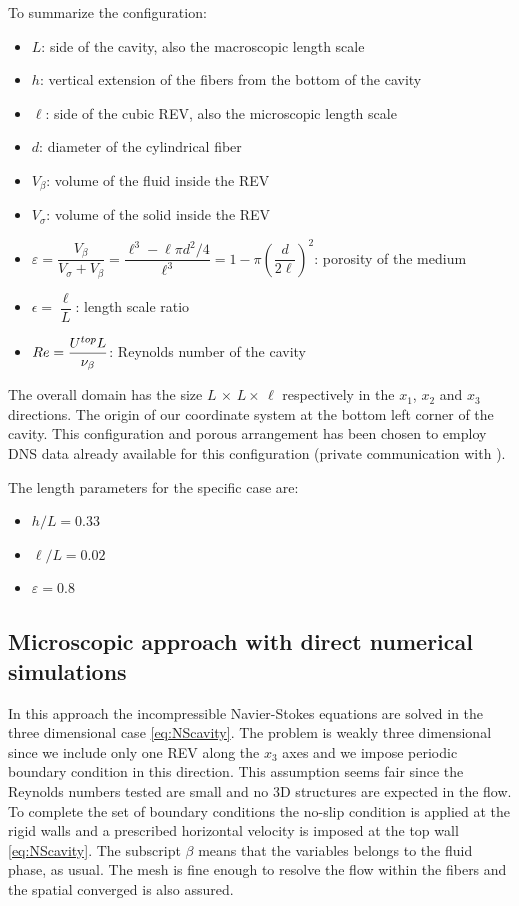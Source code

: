 To summarize the configuration:
\begin{itemize}
	\item $L$: side of the cavity, also the macroscopic length scale
	\item $h$: vertical extension of the fibers from the bottom of the cavity 
	\item $\ell$: side of the cubic REV, also the microscopic length scale
	\item $d$: diameter of the cylindrical fiber
	\item $V_{\beta}$: volume of the fluid inside the REV
	\item $V_{\sigma}$: volume of the solid inside the REV
	\item $\varepsilon = \dfrac{V_{\beta}}{V_{\sigma} +V_{\beta}} = \dfrac{\ell^3 -\ell \pi d^2 / 4}{\ell^3} = 1 - \pi \left(\dfrac{d}{2 \ell}\right)^2$: porosity of the medium
	\item $\epsilon = \dfrac{\ell}{L}$: length scale ratio
	\item $Re= \dfrac{U^{top} L}{\nu_{\beta}}$: Reynolds number of the cavity
\end{itemize}

The overall domain has the size $L \, \times \, L \times \, \ell$ respectively in the $x_1$, $x_2$ and $x_3$ directions. The origin of our coordinate system at the bottom left corner of the cavity. 
This configuration and porous arrangement has been chosen to employ DNS data already available for this configuration (private communication with \citet{zampogna2016fluid}).

The length parameters for the specific case are:
\begin{itemize}
	\item $h/L=0.33$
	\item $\ell/L=0.02$
	\item $\varepsilon = 0.8$
\end{itemize}

\subsection{Microscopic approach with direct numerical simulations}

In this approach the incompressible Navier-Stokes equations are solved in the three dimensional case \eqref{eq:NScavity}. 
The problem is weakly three dimensional since we include only one REV along the $x_3$ axes and we impose periodic boundary condition in this direction.
This assumption seems fair since the Reynolds numbers tested are small and no 3D structures are expected in the flow.
To complete the set of boundary conditions the no-slip condition is applied at the rigid walls and a prescribed horizontal velocity is imposed at the top wall \eqref{eq:NScavity}. The subscript $\beta$ means that the variables belongs to the fluid phase, as usual. The mesh is fine enough to resolve the flow within the fibers and the spatial converged is also assured.

